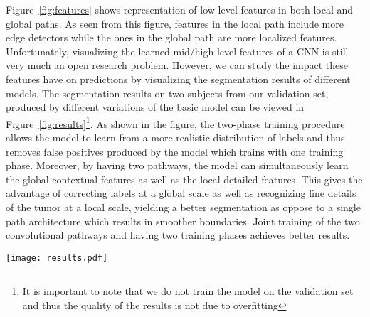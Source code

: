 \documentclass[final,5p,times,twocolumn]{elsarticle}
\begin{document}
{Figure~\ref{fig:features} shows representation of low level features in both local and global paths. As seen from this figure,  features in the local path include more edge detectors while the ones in the global path are more localized features. Unfortunately, visualizing the learned mid/high level features of a CNN is still very much an open research problem. However, we can study the impact these features have on predictions by visualizing the segmentation results of different models.
The segmentation results on two subjects from our validation set, produced by different variations of the basic model can be viewed in Figure~\ref{fig:results}\footnote{It is important to note that we do not train the model on the validation set and thus the quality of the results is not due to overfitting}. As shown in the figure, the two-phase training procedure allows the model to learn from a more realistic distribution of labels and thus removes false positives produced by the model which trains with one training phase.  Moreover, by having two pathways, the model can simultaneously learn the global contextual features as well as the local detailed features. This gives the advantage of correcting labels at a global scale as well as recognizing fine details of the tumor at a local scale, yielding a better segmentation as oppose to a single path architecture which results in smoother boundaries. Joint training of the two convolutional pathways and having two training phases achieves better results.










 

\begin{figure*}[p!]

\centering

\texttt{[image: results.pdf]}

\caption{Visual results from our CNN architectures from the Axial view. For each sub-figure, the top row from left to right shows T1C modality, the conventional one path CNN, the Conventional CNN with two training phases, and the \textsc{TwoPathCNN} model.  The second row from left to right shows the ground truth,  \textsc{LocalCascadeCNN} model, the \textsc{MFCascadeCNN} model and the \textsc{InputCascadeCNN}. The color codes are as follows:  \textcolor[RGB]{135,213,120}{} edema, \textcolor[RGB]{225,225,95}{} enhanced tumor,
\textcolor[RGB]{246,145,139}{} necrosis,
\textcolor[RGB]{124,167,208}{} non-enhanced tumor.}
\label{fig:results}
\end{figure*} 

}
\end{document}

